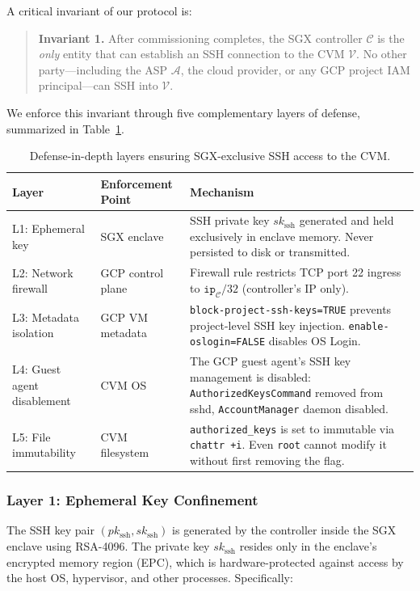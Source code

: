 A critical invariant of our protocol is:

\begin{quote}
\textbf{Invariant 1.} After commissioning completes, the SGX controller $\mathcal{C}$ is the \emph{only} entity that can establish an SSH connection to the CVM $\mathcal{V}$. No other party---including the ASP $\mathcal{A}$, the cloud provider, or any GCP project IAM principal---can SSH into $\mathcal{V}$.
\end{quote}

We enforce this invariant through five complementary layers of defense, summarized in Table~\ref{tab:ssh-hardening}.

\begin{table}[t]
\centering
\small
\begin{tabular}{@{}llp{6.5cm}@{}}
\toprule
\textbf{Layer} & \textbf{Enforcement Point} & \textbf{Mechanism} \\
\midrule
L1: Ephemeral key & SGX enclave & SSH private key $sk_{\text{ssh}}$ generated and held exclusively in enclave memory. Never persisted to disk or transmitted. \\
L2: Network firewall & GCP control plane & Firewall rule restricts TCP port 22 ingress to $\texttt{ip}_\mathcal{C}/32$ (controller's IP only). \\
L3: Metadata isolation & GCP VM metadata & \texttt{block-project-ssh-keys=TRUE} prevents project-level SSH key injection. \texttt{enable-oslogin=FALSE} disables OS Login. \\
L4: Guest agent disablement & CVM OS & The GCP guest agent's SSH key management is disabled: \texttt{AuthorizedKeysCommand} removed from sshd, \texttt{AccountManager} daemon disabled. \\
L5: File immutability & CVM filesystem & \texttt{authorized\_keys} is set to immutable via \texttt{chattr +i}. Even \texttt{root} cannot modify it without first removing the flag. \\
\bottomrule
\end{tabular}
\caption{Defense-in-depth layers ensuring SGX-exclusive SSH access to the CVM.}
\label{tab:ssh-hardening}
\end{table}

\subsubsection{Layer 1: Ephemeral Key Confinement}

The SSH key pair $(pk_{\text{ssh}}, sk_{\text{ssh}})$ is generated by the controller inside the SGX enclave using RSA-4096. The private key $sk_{\text{ssh}}$ resides only in the enclave's encrypted memory region (EPC), which is hardware-protected against access by the host OS, hypervisor, and other processes. Specifically:

